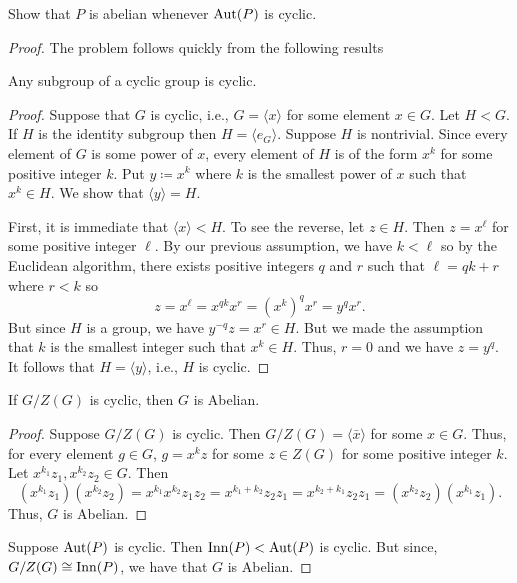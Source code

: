\begin{problem}
Show that $P$ is abelian whenever $\operatorname{Aut}(P)$ is cyclic.
\end{problem}
\begin{proof}
The problem follows quickly from the following results
\begin{lemma}
Any subgroup of a cyclic group is cyclic.
\end{lemma}
\begin{proof}
\renewcommand\qedsymbol{$\clubsuit$}
Suppose that $G$ is cyclic, i.e., $G=\langle x\rangle$ for some element
$x\in G$. Let $H<G$. If $H$ is the identity subgroup then $H=\langle e_G
\rangle$. Suppose $H$ is nontrivial. Since every element of $G$ is some
power of $x$, every element of $H$ is of the form $x^k$ for some positive
integer $k$. Put $y\coloneqq x^k$ where $k$ is the smallest power of $x$
such that $x^k\in H$. We show that $\langle y\rangle=H$.

First, it is immediate that $\langle x\rangle<H$. To see the reverse, let
$z\in H$. Then $z=x^\ell$ for some positive integer $\ell$. By our previous
assumption, we have $k<\ell$ so by the Euclidean algorithm, there exists
positive integers $q$ and $r$ such that $\ell=qk+r$ where $r<k$ so
\[
z=x^\ell=x^{qk}x^r=\left(x^k\right)^qx^r=y^qx^r.
\]
But since $H$ is a group, we have $y^{-q}z=x^r\in H$. But we made the
assumption that $k$ is the smallest integer such that $x^k\in H$. Thus,
$r=0$ and we have $z=y^q$. It follows that $H=\langle y\rangle$, i.e., $H$
is cyclic.
\end{proof}
\begin{lemma}
If $G/Z(G)$ is cyclic, then $G$ is Abelian.
\end{lemma}
\begin{proof}
\renewcommand\qedsymbol{$\clubsuit$}
Suppose $G/Z(G)$ is cyclic. Then $G/Z(G)=\langle\bar x\rangle$ for some
$x\in G$. Thus, for every element $g\in G$, $g=x^kz$ for some $z\in
Z(G)$ for some positive integer $k$. Let $x^{k_1}z_1,x^{k_2}z_2\in G$. Then
\[
(x^{k_1}z_1)(x^{k_2}z_2)=x^{k_1}x^{k_2}z_1z_2=x^{k_1+k_2}z_2z_1=x^{k_2+k_1}z_2z_1
=(x^{k_2}z_2)(x^{k_1}z_1).
\]
Thus, $G$ is Abelian.
\end{proof}
Suppose $\operatorname{Aut}(P)$ is cyclic. Then $\operatorname{Inn}(P)<\operatorname{Aut}(P)$ is cyclic. But since,
$G/Z(G)\cong\operatorname{Inn}(P)$, we have that $G$ is Abelian.
\end{proof}

